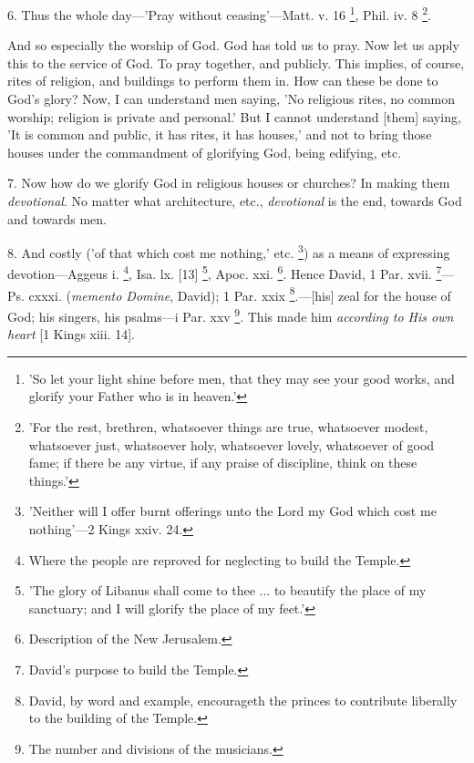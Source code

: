 6. Thus the whole day—'Pray without
ceasing'—Matt. v. 16 \footnote{'So let your light shine
before men, that they may see your good works, and glorify your Father
who is in heaven.'},
Phil. iv. 8 \footnote{'For the rest, brethren,
whatsoever things are true, whatsoever modest, whatsoever just,
whatsoever holy, whatsoever lovely, whatsoever of good fame; if there
be any virtue, if any praise of discipline, think on these things.'}.

And so especially the worship of God. God has
told us to pray. Now let us apply this to the service of God. To
pray together, and publicly. This implies, of course, rites of
religion, and buildings to perform them in. How can these be done to
God's glory? Now, I can understand men saying, 'No religious rites, no
common worship; religion is private and personal.' But I cannot
understand [them] saying, 'It is common and public, it has rites, it
has houses,' and not to bring those houses under the commandment of
glorifying God, being edifying, etc.

7. Now how do we glorify God in religious houses
or churches? In making them \emph{devotional}. No matter what
architecture, etc., \emph{devotional} is the end, towards God and
towards men.

8. And costly ('of that which cost me nothing,'
etc. \footnote{'Neither will I offer
burnt offerings unto the Lord my God which cost me nothing'—2 Kings
xxiv. 24.}) as a means of
expressing devotion—Aggeus i. \footnote{Where the people are
reproved for neglecting to build the Temple.}, Isa. lx. [13] \footnote{'The glory of Libanus
shall come to thee ... to beautify the place of my sanctuary; and I
will glorify the place of my feet.'},
Apoc. xxi. \footnote{Description of the New
Jerusalem.}. Hence
David, 1 Par. xvii. \footnote{David's purpose to build
the Temple.}—Ps.
cxxxi. (\emph{memento Domine}, David); 1 Par. xxix \footnote{David, by word and
example, encourageth the princes to contribute liberally to the
building of the Temple.}.—[his] zeal for the house of God; his singers, his psalms—i
Par. xxv \footnote{The number and divisions
of the musicians.}. This made
him \emph{according to His own heart} [1 Kings xiii. 14].

